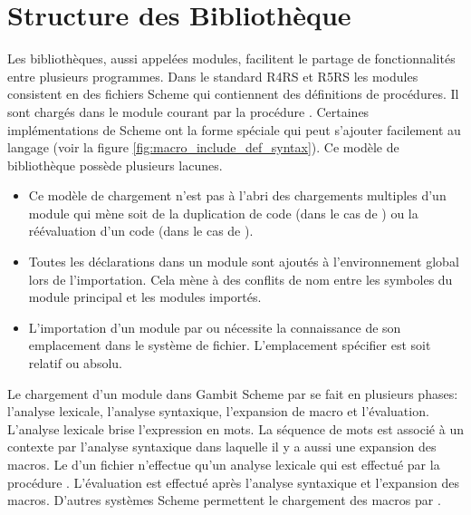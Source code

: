 \section{Structure des Bibliothèque}

Les bibliothèques, aussi appelées modules, facilitent le partage de
fonctionnalités entre plusieurs programmes. Dans le standard
R4RS\cite{Scheme:R4RS} et R5RS\cite{Scheme:R5RS} les modules consistent en des
fichiers Scheme qui contiennent des définitions de procédures. Il sont chargés dans
le module courant par la procédure . Certaines
implémentations de Scheme ont la forme spéciale  qui peut s'ajouter
facilement au langage (voir la figure \ref{fig:macro_include_def_syntax}).
Ce modèle de bibliothèque possède plusieurs lacunes.

\begin{itemize}
  \item Ce modèle de chargement n'est pas à l'abri des chargements multiples
    d'un module qui mène soit de la duplication de code (dans le cas de )
    ou la réévaluation d'un code (dans le cas de ).

  \item Toutes les déclarations dans un module sont ajoutés à l'environnement
    global lors de l'importation. Cela mène à des conflits de nom entre les
    symboles du module principal et les modules importés.

  \item L'importation d'un module par  ou  nécessite la connaissance
    de son emplacement dans le système de fichier. L'emplacement spécifier est soit relatif ou
    absolu.

\end{itemize}


Le chargement d'un module dans Gambit Scheme par  se fait en plusieurs
phases: l'analyse lexicale, l'analyse syntaxique, l'expansion de macro et
l'évaluation. L'analyse lexicale brise l'expression en mots. La séquence de
mots est associé à un contexte par l'analyse syntaxique dans laquelle il y a aussi
une expansion des macros. Le  d'un fichier n'effectue qu'un
analyse lexicale qui est effectué par la procédure . L'évaluation
est effectué après l'analyse syntaxique et l'expansion des macros. D'autres systèmes
Scheme permettent le chargement des macros par .

